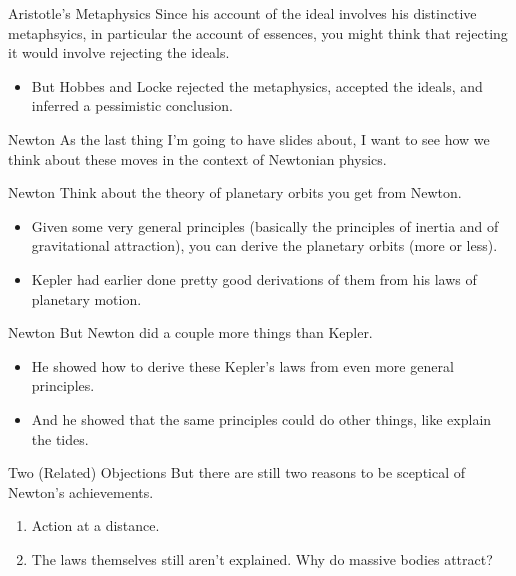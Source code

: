 \documentclass[
  17pt,
  letterpaper,
  ignorenonframetext,
  aspectratio=169,
  handout]{beamer}
\providecommand{\tightlist}{%
  \setlength{\itemsep}{0pt}\setlength{\parskip}{0pt}}\usepackage{longtable,booktabs,array}
\begin{document}
\begin{frame}{Aristotle's Metaphysics}
\protect\hypertarget{aristotles-metaphysics}{}
Since his account of the ideal involves his distinctive metaphsyics, in
particular the account of essences, you might think that rejecting it
would involve rejecting the ideals.

\begin{itemize}[<+->]
\tightlist
\item
  But Hobbes and Locke rejected the metaphysics, accepted the ideals,
  and inferred a pessimistic conclusion.
\end{itemize}
\end{frame}

\begin{frame}{Newton}
\protect\hypertarget{newton}{}
As the last thing I'm going to have slides about, I want to see how we
think about these moves in the context of Newtonian physics.
\end{frame}

\begin{frame}{Newton}
\protect\hypertarget{newton-1}{}
Think about the theory of planetary orbits you get from Newton.

\begin{itemize}[<+->]
\tightlist
\item
  Given some very general principles (basically the principles of
  inertia and of gravitational attraction), you can derive the planetary
  orbits (more or less).
\item
  Kepler had earlier done pretty good derivations of them from his laws
  of planetary motion.
\end{itemize}
\end{frame}

\begin{frame}{Newton}
\protect\hypertarget{newton-2}{}
But Newton did a couple more things than Kepler.

\begin{itemize}[<+->]
\tightlist
\item
  He showed how to derive these Kepler's laws from even more general
  principles.
\item
  And he showed that the same principles could do other things, like
  explain the tides.
\end{itemize}
\end{frame}

\begin{frame}{Two (Related) Objections}
\protect\hypertarget{two-related-objections}{}
But there are still two reasons to be sceptical of Newton's
achievements.

\begin{enumerate}[<+->]
\tightlist
\item
  Action at a distance.
\item
  The laws themselves still aren't explained. Why do massive bodies
  attract?
\end{enumerate}
\end{frame}
\end{document}
